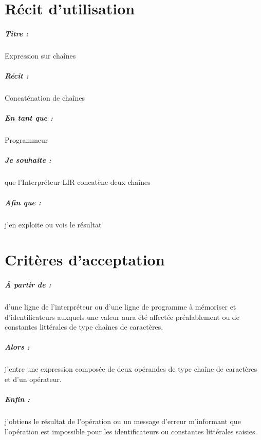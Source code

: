 \documentclass[12pt,a5paper, notitle, oneside]{report}
\begin{document}
    \chapter*{Récit d'utilisation}

    \paragraph{Titre : } Expression sur chaînes
    \paragraph{Récit : } Concaténation de chaînes
    \paragraph{En tant que : } Programmeur
    \paragraph{Je souhaite : } que l'Interpréteur LIR concatène deux chaînes
    \paragraph{Afin que : } j'en exploite ou vois le résultat
    \newpage

    \chapter*{Critères d'acceptation}

    \paragraph{À partir de : } d'une ligne de l'interpréteur ou d'une
    ligne de programme à mémoriser et d'identificateurs auxquels une
    valeur aura été affectée préalablement ou de constantes littérales
    de type chaînes de caractères.

    \paragraph{Alors : } j'entre une expression composée de deux
    opérandes de type chaîne de caractères et d'un opérateur.

    \paragraph{Enfin : } j'obtiens le résultat de l'opération ou un
    message d'erreur m'informant que l'opération est impossible pour les
    identificateurs ou constantes littérales saisies.
\end{document}

